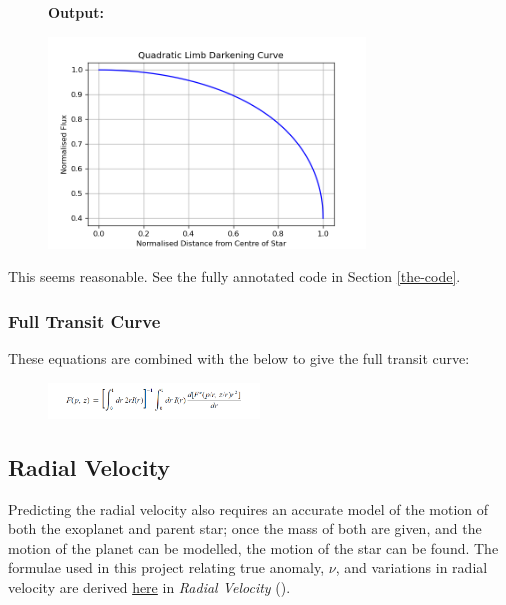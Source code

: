\documentclass[11pt]{article}
\newcommand*{\figuretitle}[1]{
    	{\textbf{#1}
    	\par\vspace{-1em}}
    }
\begin{document}
\begin{figure}[H]
	\figuretitle{Output:}
	\centering
	\includegraphics[width=0.75\textwidth]{../matplotlib_graphs/limb_darkening.png}
\end{figure}    
    
This seems reasonable. See the fully annotated code in Section \ref{the-code}.

    \hypertarget{full-transit-curve}{%
\subsubsection{Full Transit Curve}\label{full-transit-curve}}

These equations are combined with the below to give the full transit
curve:

\begin{figure}[!ht]
	\centering
	\includegraphics[width=0.5\textwidth]{../images/flux_eq.png}
	\label{Figure 2.f}
\end{figure}

    \hypertarget{radial-velocity}{%
\subsection{Radial Velocity}\label{radial-velocity}}

Predicting the radial velocity also requires an accurate model of the
motion of both the exoplanet and parent star; once the mass of both are given, and the motion of the planet can be modelled, the motion of the star can be found. The formulae used in this project relating true anomaly, \(\nu\), and variations in radial velocity are derived \href{http://exoplanets.astro.yale.edu/workshop/EPRV/Bibliography_files/Radial_Velocity.pdf}{here} in \emph{Radial Velocity} (\cite{Lovis}).
\end{document}
